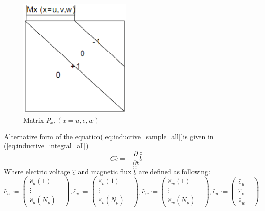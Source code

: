 \begin{figure}[!ht]
\centering
\includegraphics[width=0.5\textwidth]{bilder/P_matrix}
\caption{Matrix $P_{x},(x=u,v,w)$}
\label{fig:Matrix Px}
\end{figure}
Alternative form of the equation(\ref{eq:inductive_sample_all})is given in (\ref{eq:inductive_integral_all})
\begin{equation}
C\widehat{e}=-\frac{\partial}{\partial{t}}\widehat{\widehat{b}}
\label{eq:inductive_integral_all}
\end{equation}
Where electric voltage $\widehat{e}$ and magnetic flux $\widehat{ \widehat{b}}$ are defined as following:
\begin{equation}
\widehat{e}_{u}:=
\begin{pmatrix}
\widehat{e}_{u}(1)&\\
\vdots&\\
\widehat{e}_{u}(N_{p})&
\end{pmatrix},
\widehat{e}_{v}:=
\begin{pmatrix}
\widehat{e}_{v}(1)&\\
\vdots&\\
\widehat{e}_{v}(N_{p})&
\end{pmatrix},
\widehat{e}_{w}:=
\begin{pmatrix}
\widehat{e}_{w}(1)&\\
\vdots&\\
\widehat{e}_{w}(N_{p})&
\end{pmatrix},
\widehat{e}_{u}:=
\begin{pmatrix}
\widehat{e}_{u}&\\
\widehat{e}_{v}&\\
\widehat{e}_{w}&
\end{pmatrix}.
\label{eq:vector_e_voltage}
\end{equation}
